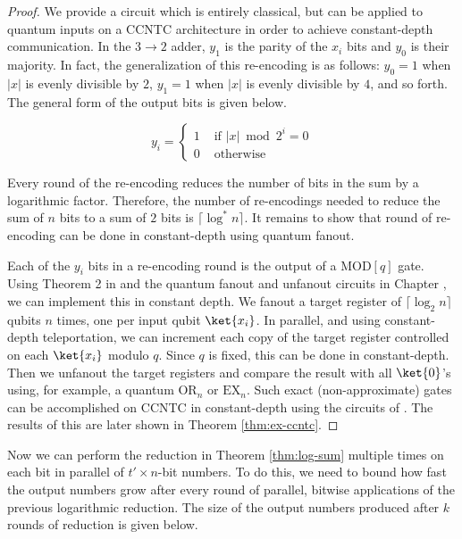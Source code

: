 \begin{proof}
We provide a circuit which is entirely classical, but can be applied to
quantum inputs on a CCNTC architecture in order to achieve
constant-depth communication.
In the $3 \rightarrow 2$ adder, $y_1$ is the parity of the $x_i$ bits and
$y_0$ is their majority. In fact, the 
generalization of this re-encoding is as follows:
$y_0=1$ when $|x|$ is evenly divisible by $2$, $y_1=1$ when
$|x|$ is evenly divisible by $4$, and so forth. The general
form of the output bits is given below.

\begin{equation}
y_i = \left\{
\begin{array}{rl}
1 & \text{ if } |x| \bmod 2^i = 0 \\
0 & \text{ otherwise } 
\end{array} \right.
\end{equation}

Every round of the re-encoding reduces the number of bits in the
sum by a logarithmic factor. Therefore, the number of re-encodings
needed to reduce the sum of $n$ bits to a sum of $2$ bits is
$\lceil \log^*n \rceil$. It remains to show that round of re-encoding
can be done in constant-depth using quantum fanout.

Each of the $y_i$ bits in a re-encoding round is the output of a
$\text{MOD}[q]$ gate. Using Theorem 2 in \cite{Hoyer2002} and the
quantum fanout and unfanout circuits in Chapter \cite{chap:factor-polylog},
we can
implement this in constant depth. We fanout a target register of
$\lceil \log_2 n \rceil$ qubits $n$ times, one per input qubit $\ket{x_i}$.
In parallel, and using constant-depth teleportation, we can increment
each copy of the target register controlled on each $\ket{x_i}$ modulo
$q$. Since $q$ is fixed, this can be done in constant-depth. Then
we unfanout the target registers and compare the result with all $\ket{0}$'s
using, for example, a quantum $\text{OR}_n$ or $\text{EX}_n$. Such exact
(non-approximate) gates can be accomplished on CCNTC in constant-depth
using the circuits of \cite{Takahashi2011}. The results of this are later shown
in Theorem \ref{thm:ex-ccntc}.
\end{proof}

Now we can perform the reduction in Theorem \ref{thm:log-sum} multiple times
on each bit in parallel of $t' \times n$-bit numbers. To do this, we need
to bound how fast the output numbers grow after every round of parallel,
bitwise applications of the previous logarithmic reduction. The size of
the output numbers produced after $k$ rounds of reduction is given below.

